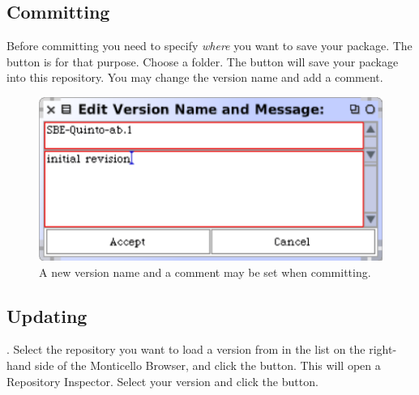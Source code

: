 \documentclass[a4paper,10pt,twoside]{book}
\begin{document}
\subsection{Committing}

Before committing you need to specify \emph{where} you want to save your package. The  button is for that purpose. Choose a folder.   The  button will save your package into this repository. You may change the version name and add a comment. 

\begin{figure}[ht]\centering
	\includegraphics[width=.55\linewidth]{saving.png}
	\caption{A new version name and a comment may be set when committing.}
\end{figure}

\subsection{Updating}

. 
Select the repository you want to load a version from in the list on the right-hand side of the Monticello Browser, and click the  button. This will open a Repository Inspector. Select your version and click the  button.


\end{document}
